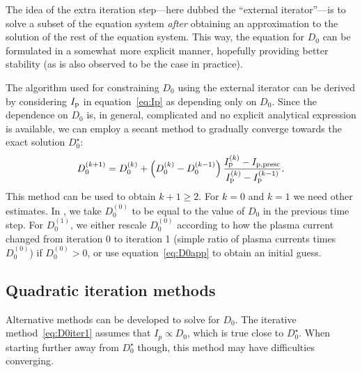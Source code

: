 \documentclass{notes}
\begin{document}
	The idea of the extra iteration step---here dubbed the ``external
	iterator''---is to solve a subset of the equation system \emph{after}
	obtaining an approximation to the solution of the rest of the equation
	system. This way, the equation for $D_0$ can be formulated in a somewhat
	more explicit manner, hopefully providing better stability (as is also
	observed to be the case in practice).

	The algorithm used for constraining $D_0$ using the external iterator can
	be derived by considering $I_{\rm p}$ in equation~\eqref{eq:Ip} as
	depending only on $D_0$. Since the dependence on $D_0$ is, in general,
	complicated and no explicit analytical expression is available, we can
	employ a secant method to gradually converge towards the exact solution
	$D_0^\star$:
	\begin{equation}\label{eq:D0iter1}
		D_0^{(k+1)} = D_0^{(k)} +
			\left(D_0^{(k)} - D_0^{(k-1)}\right)
			\frac{I_{\rm p}^{(k)}-I_{\rm p,presc}}{I_{\rm p}^{(k)}-I_{\rm p}^{(k-1)}}.
	\end{equation}
	This method can be used to obtain $k+1\geq 2$. For $k=0$ and $k=1$ we need
	other estimates. In \DREAM, we take $D_0^{(0)}$ to be equal to the value of
	$D_0$ in the previous time step. For $D_0^{(1)}$, we either rescale
	$D_0^{(0)}$ according to how the plasma current changed from iteration 0 to
	iteration 1 (simple ratio of plasma currents times $D_0^{(0)}$) if
	$D_0^{(0)} > 0$, or use equation~\eqref{eq:D0app} to obtain an initial guess.

	\subsection{Quadratic iteration methods}
	Alternative methods can be developed to solve for $D_0$. The iterative
	method~\eqref{eq:D0iter1} assumes that $I_p\propto D_0$, which is true close
	to $D_0^\star$. When starting further away from $D_0^\star$ though, this
	method may have difficulties converging.
\end{document}
